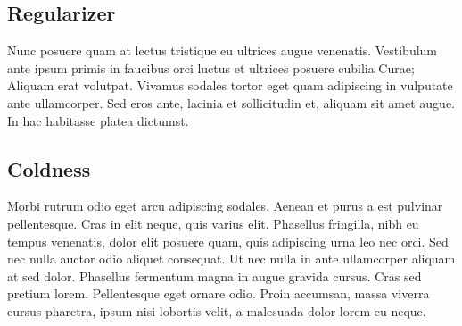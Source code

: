 \subsection{Regularizer}

Nunc posuere quam at lectus tristique eu ultrices augue venenatis. Vestibulum ante ipsum primis in faucibus orci luctus et ultrices posuere cubilia Curae; Aliquam erat volutpat. Vivamus sodales tortor eget quam adipiscing in vulputate ante ullamcorper. Sed eros ante, lacinia et sollicitudin et, aliquam sit amet augue. In hac habitasse platea dictumst.


\subsection{Coldness}
Morbi rutrum odio eget arcu adipiscing sodales. Aenean et purus a est pulvinar pellentesque. Cras in elit neque, quis varius elit. Phasellus fringilla, nibh eu tempus venenatis, dolor elit posuere quam, quis adipiscing urna leo nec orci. Sed nec nulla auctor odio aliquet consequat. Ut nec nulla in ante ullamcorper aliquam at sed dolor. Phasellus fermentum magna in augue gravida cursus. Cras sed pretium lorem. Pellentesque eget ornare odio. Proin accumsan, massa viverra cursus pharetra, ipsum nisi lobortis velit, a malesuada dolor lorem eu neque.

